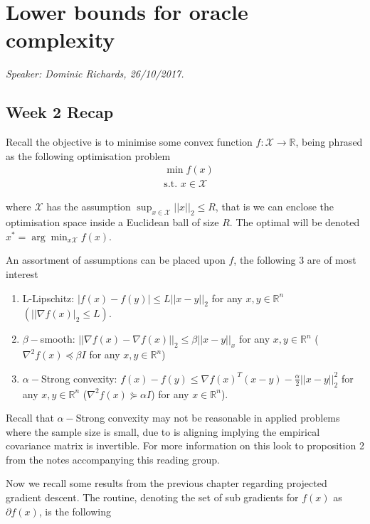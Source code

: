 
\section{Lower bounds for oracle complexity}

\emph{Speaker: Dominic Richards, 26/10/2017.}\\

\subsection{Week 2 Recap}

Recall the objective is to minimise some convex function $f: \mathcal{X} \rightarrow \mathbb{R}$, being phrased as the following optimisation problem
\begin{align}
& \min f(x) \\
& \text{s.t. } x \in \mathcal{X}
\end{align}


where $\mathcal{X}$ has the assumption $\sup_{x \in \mathcal{X}} ||x||_2 \leq R$, that is we can enclose the optimisation space inside a Euclidean ball of size $R$. The optimal will be denoted $x^{*} = \arg\min_{x  \mathcal{X}} f(x)$.  

An assortment of assumptions can be placed upon $f$, the following 3 are of most interest

\begin{enumerate}
\item{L-Lipschitz: $|f(x) - f(y)| \leq L ||x-y||_2$ for any $x,y \in \mathbb{R}^n$ $(||\nabla f(x)|_2 \leq L)$.}
\item{$\beta-$smooth: $||\nabla f(x) - \nabla f(x)||_2 \leq \beta||x-y||_x$ for any $x,y \in \mathbb{R}^n$ ($\nabla^2 f(x) \preccurlyeq \beta I$ for any $x,y \in \mathbb{R}^n$)}
\item{$\alpha-$Strong convexity: $f(x) - f(y) \leq \nabla f(x)^T (x-y) - \frac{\alpha}{2} ||x-y||_2^2$ for any $x,y \in \mathbb{R}^n$ ($\nabla^2 f(x)  \curlyeqsucc \alpha I$) for any $x \in \mathbb{R}^n$)}.
\end{enumerate}

Recall that $\alpha-$Strong convexity may not be reasonable in applied problems where the sample size is small, due to is aligning implying the empirical covariance matrix is invertible. For more information on this look  to proposition 2 from the notes accompanying this reading group. 


Now we recall some results from the previous chapter regarding projected gradient descent. The routine, denoting the set of sub gradients for $f(x)$ as $\partial f(x)$, is the following


